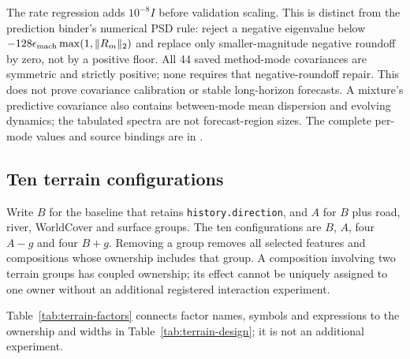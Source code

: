 \documentclass[11pt]{article}
\begin{document}
The rate regression adds $10^{-8}I$ before validation scaling. This is
distinct from the prediction binder's numerical PSD rule: reject a negative
eigenvalue below $-128\epsilon_{\rm mach}\max(1,\|R_m\|_2)$ and replace only
smaller-magnitude negative roundoff by zero, not by a positive floor.
All 44 saved method-mode covariances are symmetric and strictly positive;
none requires that negative-roundoff repair. This does not prove covariance
calibration or stable long-horizon forecasts. A mixture's predictive
covariance also contains between-mode mean dispersion and evolving dynamics;
the tabulated spectra are not forecast-region sizes. The complete per-mode
values and source bindings are in
.

\subsection{Ten terrain configurations}
Write \(B\) for the baseline that retains \texttt{history.direction}, and
\(A\) for \(B\) plus road, river, WorldCover and surface groups. The ten
configurations are \(B\), \(A\), four \(A-g\) and four \(B+g\). Removing a
group removes all selected features and compositions whose ownership includes
that group. A composition involving two terrain groups has coupled ownership;
its effect cannot be uniquely assigned to one owner without an additional
registered interaction experiment.

Table~\ref{tab:terrain-factors} connects factor names, symbols and expressions to the ownership and widths in Table~\ref{tab:terrain-design}; it is not an additional experiment.
\end{document}
